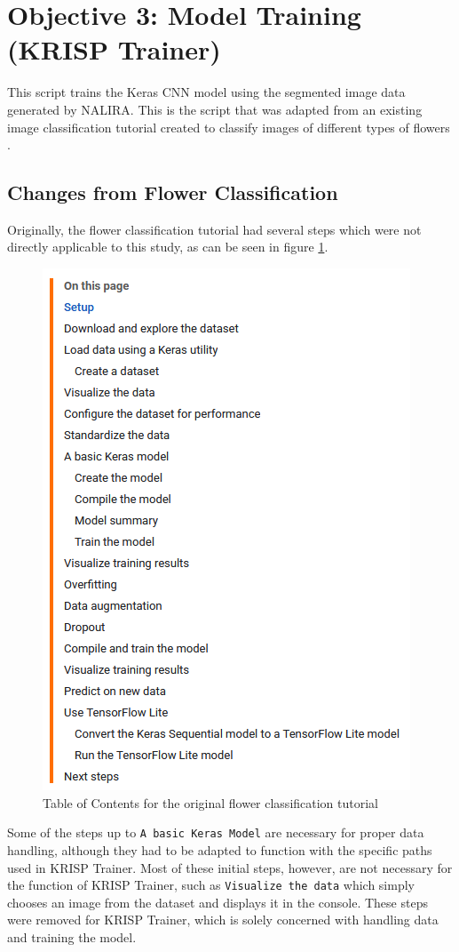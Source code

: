 \section{Objective 3: Model Training (KRISP Trainer)}
This script trains the Keras CNN model using the segmented image data generated by NALIRA. This is the script that was adapted from an existing image classification tutorial created to classify images of different types of flowers \citep{imageclassification_2024}. 

\subsection{Changes from Flower Classification}
Originally, the flower classification tutorial had several steps which were not directly applicable to this study, as can be seen in figure \ref{fig:ME outline OG flower classification}. 

\begin{figure}
    \centering
    \includegraphics[width=0.5\linewidth]{contents/figures/ME outline of flower classification.jpg}
    \caption{Table of Contents for the original flower classification tutorial \citep{imageclassification_2024}}
    \label{fig:ME outline OG flower classification}
\end{figure}

Some of the steps up to \verb|A basic Keras Model| are necessary for proper data handling, although they had to be adapted to function with the specific paths used in KRISP Trainer. Most of these initial steps, however, are not necessary for the function of KRISP Trainer, such as \verb|Visualize the data| which simply chooses an image from the dataset and displays it in the console. These steps were removed for KRISP Trainer, which is solely concerned with handling data and training the model. 

